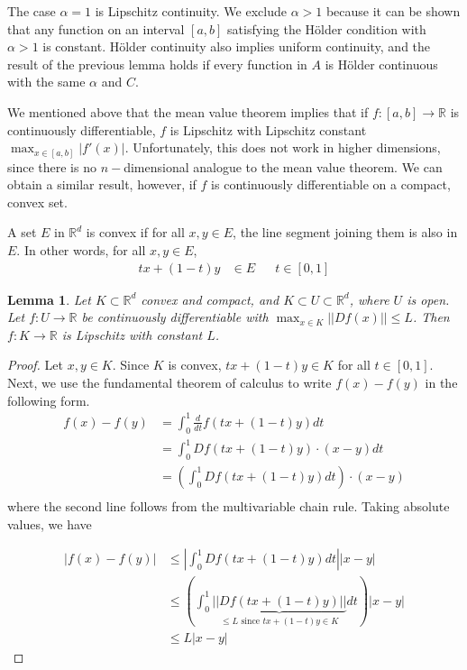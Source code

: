 \documentclass[10pt]{article}         %
\newtheorem{lemma}{Lemma}[section]
\theoremstyle{remark}
\newcommand{\R}{\mathbb{R}}
\begin{document}
The case $\alpha = 1$ is Lipschitz continuity. We exclude $\alpha > 1$ because it can be shown that any function on an interval $[a, b]$ satisfying the H\"{o}lder condition with $\alpha > 1$ is constant. H\"{o}lder continuity also implies uniform continuity, and the result of the previous lemma holds if every function in $A$ is H\"{o}lder continuous with the same $\alpha$ and $C$.

We mentioned above that the mean value theorem implies that if $f: [a, b] \rightarrow \R$ is continuously differentiable, $f$ is Lipschitz with Lipschitz constant $\max_{x\in [a,b]}|f'(x)|$.  Unfortunately, this does not work in higher dimensions, since there is no $n-$dimensional analogue to the mean value theorem.  We can obtain a similar result, however, if $f$ is continuously differentiable on a compact, convex set.

\begin{defintion}
A set $E$ in $\R^d$ is convex if for all $x, y \in E$, the line segment joining them is also in $E$. In other words, for all $x, y \in E$,
\begin{align*}
tx + (1 - t)y &\in E && t \in [0, 1]
\end{align*}
\end{defintion}

\begin{lemma}
Let $K \subset \R^d$ convex and compact, and $K \subset U \subset \R^d$, where $U$ is open. Let $f: U \rightarrow \R$ be continuously differentiable  with $\max_{x \in K} ||Df(x)|| \leq L$. Then $f: K \rightarrow \R$ is Lipschitz with constant $L$.
\end{lemma}

\begin{proof}
Let $x,y \in K$. Since $K$ is convex, $tx + (1 - t)y \in K$ for all 
$t \in [0,1]$. Next, we use the fundamental theorem of calculus to write $f(x)- f(y)$ in the following form.
\begin{align*}
f(x)- f(y) &= \int_0^1 \frac{d}{dt} f(tx + (1-t)y) dt \\
&= \int_0^1 Df(tx + (1-t)y) \cdot (x-y) dt \\
&= \left( \int_0^1 Df(tx + (1-t)y) dt \right) \cdot (x-y) \\
\end{align*}
where the second line follows from the multivariable chain rule. Taking absolute values, we have

\begin{align*}        
|f(x)- f(y)| &\leq \left| \int_0^1 Df(tx + (1-t)y) dt \right| |x-y| \\
&\leq \left( \int_0^1 \underbrace{ || Df(tx + (1-t)y) || }_{\leq L \text{ since } tx + (1 - t)y \in K } dt \right) |x-y| \\
&\leq L |x-y|
\end{align*}
    
\end{proof}
\end{document}
